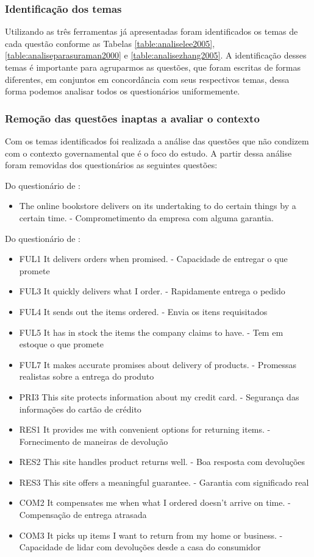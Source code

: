 	\subsubsection{Identificação dos temas}

	Utilizando as três ferramentas já apresentadas foram identificados os temas de cada questão conforme as Tabelas \ref{table:analiselee2005}, \ref{table:analiseparasuraman2000} e \ref{table:analisezhang2005}. A identificação desses temas é importante para agruparmos as questões, que foram escritas de formas diferentes, em conjuntos em concordância com seus respectivos temas, dessa forma podemos analisar todos os questionários uniformemente.


	\subsubsection{Remoção das questões inaptas a avaliar o contexto}

	Com os temas identificados foi realizada a análise das questões que não condizem com o contexto governamental que é o foco do estudo. A partir dessa análise foram removidas dos questionários as seguintes questões:
	
	Do questionário de \cite{lee2005}:
	\begin{itemize}
		\item {The online bookstore delivers on its undertaking to do certain things by a certain time.	-	Comprometimento da empresa com alguma garantia.} 
	\end{itemize}
	
	Do questionário de \cite{parasuraman2000}:
	\begin{itemize}
		\item {FUL1 It delivers orders when promised.	-	Capacidade de entregar o que promete} 
		\item {FUL3 It quickly delivers what I order.	-	Rapidamente entrega o pedido}
		\item {FUL4 It sends out the items ordered.	-	Envia os itens requisitados}
		\item {FUL5 It has in stock the items the company claims to have.	-	Tem em estoque o que promete}
		\item {FUL7 It makes accurate promises about delivery of products.	-	Promessas realistas sobre a entrega do produto}
		\item {PRI3 This site protects information about my credit card.	-	Segurança das informações do cartão de crédito}
		\item {RES1 It provides me with convenient options for returning items.	-	Fornecimento de maneiras de devolução}
		\item {RES2 This site handles product returns well.	-	Boa resposta com devoluções}
		\item {RES3 This site offers a meaningful guarantee.	-	Garantia com significado real}
		\item {COM2 It compensates me when what I ordered doesn’t arrive on time.	-	Compensação de entrega atrasada}
		\item {COM3 It picks up items I want to return from my home or business.	-	Capacidade de lidar com devoluções desde a casa do consumidor}
	\end{itemize}
	
